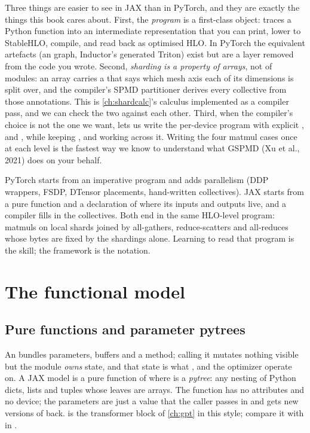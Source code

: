 Three things are easier to see in JAX than in PyTorch, and they are exactly the things this
book cares about. First, the \emph{program} is a first-class object:  traces a
Python function into an intermediate representation that you can print, lower to StableHLO,
compile, and read back as optimised HLO. In PyTorch the equivalent artefacts (an 
graph, Inductor's generated Triton) exist but are a layer removed from the code you wrote. Second,
\emph{sharding is a property of arrays}, not of modules: an array carries a
 that says which mesh axis each of its dimensions is split over, and the
compiler's SPMD partitioner derives every collective from those annotations. This is
\cref{ch:shardcalc}'s calculus implemented as a compiler pass, and we can check the two
against each other. Third, when the compiler's choice is not the one we want, 
lets us write the per-device program with explicit ,  and
, while keeping ,  and  working across it.
Writing the four matmul cases once at each level is the fastest way we know to understand
what GSPMD (Xu et al., 2021) does on your behalf.

\begin{keyidea}
PyTorch starts from an imperative program and adds parallelism (DDP wrappers, FSDP, DTensor
placements, hand-written collectives). JAX starts from a pure function and a declaration of
where its inputs and outputs live, and a compiler fills in the collectives. Both end in the
same HLO-level program: matmuls on local shards joined by all-gathers, reduce-scatters and
all-reduces whose bytes are fixed by the shardings alone. Learning to read that program is
the skill; the framework is the notation.
\end{keyidea}

\section{The functional model}\label{sec:jax:functional}

\subsection{Pure functions and parameter pytrees}
An  bundles parameters, buffers and a  method; calling it
mutates nothing visible but the module \emph{owns} state, and that state is what
,  and the optimizer operate on. A JAX model is a
pure function of  where  is a \emph{pytree}: any nesting
of Python dicts, lists and tuples whose leaves are arrays. The function has no attributes
and no device; the parameters are just a value that the caller passes in and gets new
versions of back.  is the transformer block of \cref{ch:gpt} in this
style; compare it with  in .

